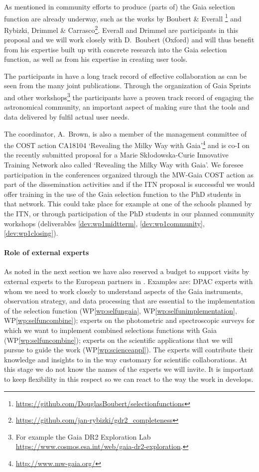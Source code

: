 As mentioned in  community efforts to produce (parts of) the Gaia selection function are already underway, such as the works by Boubert \& Everall \cite{Boubert2020a, Boubert2020b}\footnote{\url{https://github.com/DouglasBoubert/selectionfunctions}} and Rybizki, Drimmel \& Carrasco\footnote{\url{https://github.com/jan-rybizki/gdr2_completeness}}. Everall and Drimmel are participants in this proposal and we will work closely with D.~Boubert (Oxford) and will thus benefit from his expertise built up with concrete research into the Gaia selection function, as well as from his expertise in creating user tools.

The participants in {\acro} have a long track record of effective collaboration as can be seen from the many joint publications. Through the organization of Gaia Sprints and other workshops\footnote{For example the Gaia DR2 Exploration Lab \url{https://www.cosmos.esa.int/web/gaia-dr2-exploration}.} the participants have a proven track record of engaging the astronomical community, an important aspect of making sure that the tools and data delivered by {\acro} fulfil actual user needs.

The coordinator, A.~Brown, is also a member of the management committee of the COST action CA18104 `Revealing the Milky Way with Gaia'\footnote{\url{http://www.mw-gaia.org/}} and is co-I on the recently submitted proposal for a Marie Sk\l{}odowska-Curie Innovative Training Network also called `Revealing the Milky Way with Gaia'. We foresee participation in the conferences organized through the MW-Gaia COST action as part of the dissemination activities and if the ITN proposal is successful we would offer training in the use of the Gaia selection function to the PhD students in that network. This could take place for example at one of the schools planned by the ITN, or through participation of the PhD students in our planned community workshops (deliverables \ref{dev:wp1midtterm}, \ref{dev:wp1community}, \ref{dev:wp1closing}).

\paragraph{Role of external experts} As noted in the next section we have also reserved a budget to support visits by external experts to the European partners in {\acro}. Examples are: DPAC experts with whom we need to work closely to understand aspects of the Gaia instruments, observation strategy, and data processing that are essential to the implementation of the selection function (WP\ref{wp:selfungaia}, WP\ref{wp:selfunimplementation}, WP\ref{wp:selfuncombine}); experts on the photometric and spectroscopic surveys for which we want to implement combined selections functions with Gaia (WP\ref{wp:selfuncombine}); experts on the scientific applications that we will pursue to guide the {\acro} work (WP\ref{wp:scienceappl}). The experts will contribute their knowledge and insights to {\acro} in the way customary for scientific collaborations. At this stage we do not know the names of the experts we will invite. It is important to keep flexibility in this respect so we can react to the way the work in {\acro} develops.

